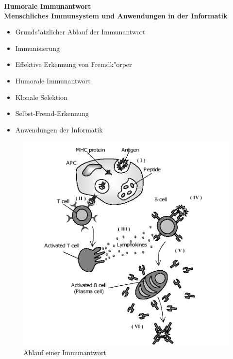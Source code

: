\documentclass[10pt, a4]{seminar}
\begin{document}
\renewcommand{\SlideTopicEntry}{}          %
\renewcommand{\SlideTitleEntry}{Vortrag Humorale Immunantwort}  %
\pagestyle{NamedFrame}

\begin{slide}
\pagestyle{EmptyFrame}
\begin{center}
{\bf\LARGE Humorale Immunantwort}\\
{\bf Menschliches Immunsystem und Anwendungen in der Informatik}\\
\vspace{1cm}
\end{center}
\end{slide}



\begin{slide}
\begin{itemize}
\item Grunds"atzlicher Ablauf der Immunantwort
\item Immunisierung
\item Effektive Erkennung von Fremdk"orper
\item Humorale Immunantwort
\item Klonale Selektion
\item Selbst-Fremd-Erkennung
\item Anwendungen der Informatik
\end{itemize}

\vfill
\end{slide}


\begin{slide}
\begin{figure}[h]
\includegraphics[scale=0.2]{immunablauf.png}
\caption{Ablauf einer Immunantwort}
\end{figure}
\vfill
\end{slide}
\end{document}
